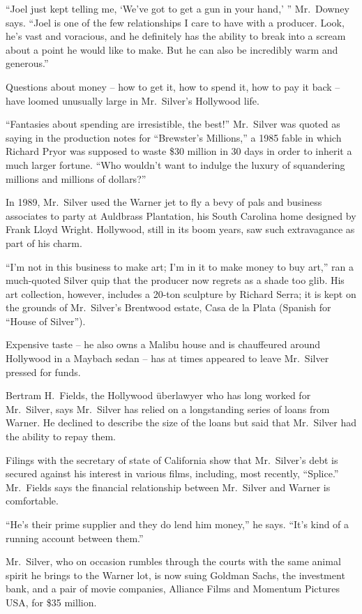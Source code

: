 ﻿\documentclass[12pt]{article}
\begin{document}
``Joel just kept telling me, `We've got to get a gun in your hand,' '' Mr.~Downey says. ``Joel is
one of the few relationships I care to have with a producer. Look, he's vast and voracious, and he
definitely has the ability to break into a scream about a point he would like to make. But he can
also be incredibly warm and generous.''

Questions about money -- how to get it, how to spend it, how to pay it back -- have loomed unusually
large in Mr.~Silver's Hollywood life.

``Fantasies about spending are irresistible, the best!'' Mr.~Silver was quoted as saying in the
production notes for ``Brewster's Millions,'' a 1985 fable in which Richard Pryor was supposed to
waste \$30 million in 30 days in order to inherit a much larger fortune. ``Who wouldn't want to
indulge the luxury of squandering millions and millions of dollars?''

In 1989, Mr.~Silver used the Warner jet to fly a bevy of pals and business associates to party at
Auldbrass Plantation, his South Carolina home designed by Frank Lloyd Wright. Hollywood, still in
its boom years, saw such extravagance as part of his charm.

``I'm not in this business to make art; I'm in it to make money to buy art,'' ran a much-quoted
Silver quip that the producer now regrets as a shade too glib. His art collection, however, includes
a 20-ton sculpture by Richard Serra; it is kept on the grounds of Mr.~Silver's Brentwood estate,
Casa de la Plata (Spanish for ``House of Silver'').

Expensive taste -- he also owns a Malibu house and is chauffeured around Hollywood in a Maybach
sedan -- has at times appeared to leave Mr.~Silver pressed for funds.

Bertram H.~Fields, the Hollywood überlawyer who has long worked for Mr.~Silver, says Mr.~Silver has
relied on a longstanding series of loans from Warner. He declined to describe the size of the loans
but said that Mr.~Silver had the ability to repay them.

Filings with the secretary of state of California show that Mr.~Silver's debt is secured against his
interest in various films, including, most recently, ``Splice.'' Mr.~Fields says the financial
relationship between Mr.~Silver and Warner is comfortable.

``He's their prime supplier and they do lend him money,'' he says. ``It's kind of a running account
between them.''

Mr.~Silver, who on occasion rumbles through the courts with the same animal spirit he brings to the
Warner lot, is now suing Goldman Sachs, the investment bank, and a pair of movie companies, Alliance
Films and Momentum Pictures USA, for \$35 million.
\end{document}
